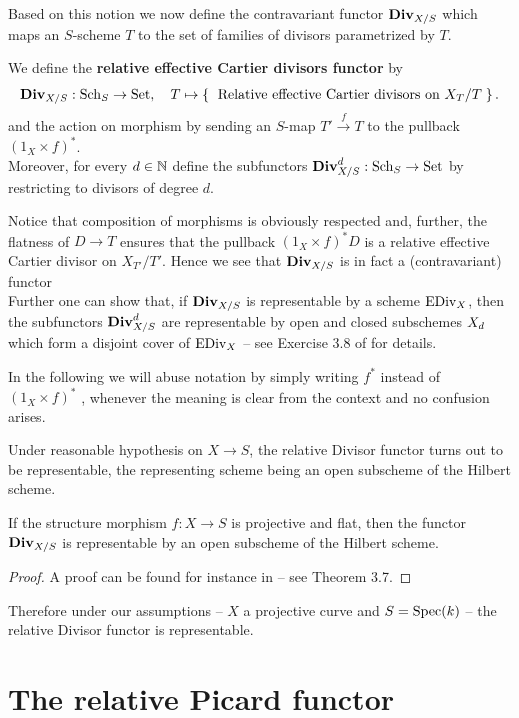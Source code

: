 	Based on this notion we now define the contravariant functor $\operatorname{\mathbf{Div}}_{X/S}$ which maps an $S$-scheme $T$ to the set of families of divisors parametrized by $T$.
	\begin{defi}
		We define the \textbf{relative effective Cartier divisors functor} by
		$$ \operatorname{\mathbf{Div}}_{X/S}:\operatorname{Sch}_S \to \operatorname{Set}, \quad T \mapsto \left\{\;  \text{ Relative effective Cartier divisors} \text{ on } X_T/T  \; \right\}. $$
		and the action on morphism by sending an $S$-map $T'\overset{f}\to T$ to the pullback $(1_X\times f)^*$.\\ 
		Moreover, for every $d\in \mathbb{N}$ define the subfunctors $\operatorname{\mathbf{Div}}_{X/S}^d:\operatorname{Sch}_S \to \operatorname{Set}$ by restricting to divisors of degree $d$.
	\end{defi}
	\begin{rema}
		Notice that composition of morphisms is obviously respected and, further, the flatness of $D\to T$ ensures that the pullback $(1_X\times f)^*D$ is a relative effective Cartier divisor on $X_{T'}/T'$. Hence we see that $\operatorname{\mathbf{Div}}_{X/S}$ is in fact a (contravariant) functor \\
		Further one can show that, if $\operatorname{\mathbf{Div}}_{X/S}$ is representable by a scheme $\operatorname{EDiv}_X$, then the subfunctors $\operatorname{\mathbf{Div}}_{X/S}^d$ are representable by open and closed subschemes $X_d$ which form a disjoint cover of $\operatorname{EDiv}_X$ -- see Exercise 3.8 of \cite{PICARD} for details.
	\end{rema}
	\begin{notation}
		In the following we will abuse notation by simply writing $f^*$ instead of $(1_X\times f)^*$ , whenever the meaning is clear from the context and no confusion arises.
	\end{notation}
	Under reasonable hypothesis on $X\to S$, the relative Divisor functor turns out to be representable, the representing scheme being an open subscheme of the Hilbert scheme.
	\begin{theo}\label{thm:div_representable}
		If the structure morphism $f:X\to S$ is projective and flat, then the functor $\operatorname{\mathbf{Div}}_{X/S}$ is representable by an open subscheme of the Hilbert scheme.
	\end{theo}
	\begin{proof}
		A proof can be found for instance in \cite{PICARD} -- see Theorem 3.7.
	\end{proof}
	Therefore under our assumptions -- $X$ a projective curve and $S=\operatorname{Spec}(k)$ -- the relative Divisor functor is representable.\\	

\section{The relative Picard functor}\label{sec:Pic_functor}
	
